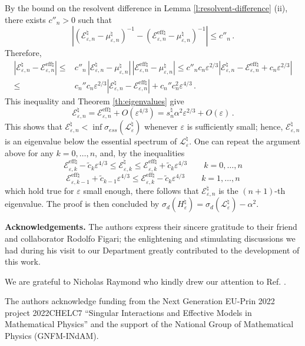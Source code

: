 \documentclass[a4paper,11pt,reqno]{amsart}
\theoremstyle{definition}
\numberwithin{equation}{section}
\newcommand{\Lscr}{\mathscr{L}}
\newcommand{\ve}{\varepsilon}
\newcommand{\eff}{\mathrm{eff}}
\newcommand{\bosfer}{{\natural}}
\newcommand{\eigenvalueL}{\mathscr{E}}
\begin{document}
By the bound on the resolvent difference in Lemma \ref{l:resolvent-difference} (ii), there exists $c''_{n}>0$ such that 
\[
\left|(\eigenvalueL^{\bosfer}_{\ve,n}-\mu^{\bosfer}_{\ve,n})^{-1}- (\eigenvalueL^{\eff\bosfer}_{\ve,n} - \mu^{\bosfer}_{\ve,n})^{-1}\right|\le c''_{n}\,.
\]
Therefore, 
\begin{align*}
|\eigenvalueL^{\bosfer}_{\ve,n}-\eigenvalueL^{\eff\bosfer}_{\ve,n}|\le& c''_{n}\,|\eigenvalueL^{\bosfer}_{\ve,n}-\mu^{\bosfer}_{\ve,n}|\,|\eigenvalueL^{\eff\bosfer}_{\ve,n} - \mu^{\bosfer}_{\ve,n}|\le c''_{n}c_{n}\ve^{2/3}|\eigenvalueL^{\bosfer}_{\ve,n}-\eigenvalueL^{\eff\bosfer}_{\ve,n}+c_{n}\ve^{2/3}|\\
\le &c_{n}''c_{n}\ve^{2/3}|\eigenvalueL^{\bosfer}_{\ve,n}-\eigenvalueL^{\eff\bosfer}_{\ve,n}|+c_{n}''c^{2}_{n}\ve^{4/3}\,.
\end{align*}
This inequality and Theorem \ref{th:eigenvalues} give 
\[
\eigenvalueL^{\bosfer}_{\ve,n}=\eigenvalueL^{\eff\bosfer}_{\ve,n}+O(\ve^{4/3})= s_{n}^{\bosfer}\alpha^2\ve^{2/3} +O(\ve)\,.
\]
This shows that $\eigenvalueL^{\bosfer}_{\ve,n}<\inf\sigma_{ess}(\Lscr_\ve^\bosfer)$ whenever $\ve$ is sufficiently small; hence, $\eigenvalueL^{\bosfer}_{\ve,n}$ is an eigenvalue below the essential spectrum of $\Lscr_\ve^\bosfer$. One can repeat the argument above for any $k=0,\dots,n$, and, by the inequalities  
\[
\eigenvalueL^{\eff\bosfer}_{\ve,k} -\tilde c_k \ve^{4/3}  \leq 
\eigenvalueL^{\bosfer}_{\ve,k}\leq \eigenvalueL^{\eff\bosfer}_{\ve,k} +\tilde c_k \ve^{4/3}\qquad k=0,\dots,n
\]
\[
 \eigenvalueL^{\eff\bosfer}_{\ve,k-1}+\tilde c_{k-1} \ve^{4/3}  \leq 
\eigenvalueL^{\eff\bosfer}_{\ve,k} -\tilde c_k \ve^{4/3} \qquad k=1,\dots,n
\]
which hold true for $\ve$ small enough, there follows that $\eigenvalueL^{\bosfer}_{\ve,n}$ is the $(n+1)$-th eigenvalue.   The proof is then concluded by $\sigma_{d}(H^\bosfer_\ve)=\sigma_{d}(\Lscr_\ve^\bosfer)-\alpha^{2}$.

\vskip10pt\noindent
{\bf Acknowledgements.}
The authors express their sincere gratitude to their  friend and collaborator Rodolfo Figari; the enlightening and stimulating discussions we had during his visit to our Department greatly contributed to the development of this work.

We are grateful to Nicholas Raymond who kindly drew our attention  to Ref. \cite{DucheneRaymond14}. 

The authors acknowledge funding from the Next Generation EU-Prin 2022 project 2022CHELC7 ``Singular Interactions and Effective Models in Mathematical Physics'' and the support of the National Group of Mathematical Physics (GNFM-INdAM). 
\end{document}
